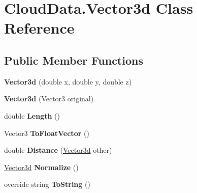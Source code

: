 \hypertarget{class_cloud_data_1_1_vector3d}{}\section{Cloud\+Data.\+Vector3d Class Reference}
\label{class_cloud_data_1_1_vector3d}
\subsection*{Public Member Functions}
\begin{DoxyCompactItemize}
\item 
\mbox{\label{class_cloud_data_1_1_vector3d_ad2881cceccb024d4ef4199bfc929fcf8}} 
{\bfseries Vector3d} (double x, double y, double z)
\item 
\mbox{\label{class_cloud_data_1_1_vector3d_a088e6cdaef20806391cdc35efd2e391c}} 
{\bfseries Vector3d} (Vector3 original)
\item 
\mbox{\label{class_cloud_data_1_1_vector3d_aceee287d1095923c8e2daf3bb9065ef8}} 
double {\bfseries Length} ()
\item 
\mbox{\label{class_cloud_data_1_1_vector3d_a5a8514c9c89cfae9e22e4ee5835b0e8f}} 
Vector3 {\bfseries To\+Float\+Vector} ()
\item 
\mbox{\label{class_cloud_data_1_1_vector3d_ab9c83d4bca9b0f61d30536eb897abf52}} 
double {\bfseries Distance} (\hyperlink{class_cloud_data_1_1_vector3d}{Vector3d} other)
\item 
\mbox{\label{class_cloud_data_1_1_vector3d_a4c52053302fdfe5c09a69397b80df797}} 
\hyperlink{class_cloud_data_1_1_vector3d}{Vector3d} {\bfseries Normalize} ()
\item 
\mbox{\label{class_cloud_data_1_1_vector3d_affd049ff0e11d92fffbc0627f31e281f}} 
override string {\bfseries To\+String} ()
\end{DoxyCompactItemize}
